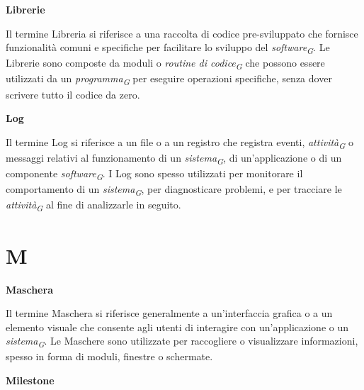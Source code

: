 \documentclass{article}
\begin{document}
\vspace{0.4cm}

\textbf{Librerie}

\vspace{0.1cm}

Il termine Libreria si riferisce a una raccolta di codice pre-sviluppato che fornisce funzionalità comuni e specifiche per facilitare lo sviluppo del \textit{software}\textsubscript{\textit{G}}. Le Librerie sono composte da moduli o \textit{routine di codice}\textsubscript{\textit{G}} che possono essere utilizzati da un \textit{programma}\textsubscript{\textit{G}} per eseguire operazioni specifiche, senza dover scrivere tutto il codice da zero.

\vspace{0.4cm}

\textbf{Log}

\vspace{0.1cm}

Il termine Log si riferisce a un file o a un registro che registra eventi, \textit{attività}\textsubscript{\textit{G}} o messaggi relativi al funzionamento di un \textit{sistema}\textsubscript{\textit{G}}, di un'applicazione o di un componente \textit{software}\textsubscript{\textit{G}}. I Log sono spesso utilizzati per monitorare il comportamento di un \textit{sistema}\textsubscript{\textit{G}}, per diagnosticare problemi, e per tracciare le \textit{attività}\textsubscript{\textit{G}} al fine di analizzarle in seguito.

\pagebreak
\section*{M}
{}

\vspace{0.4cm}

\textbf{Maschera}

\vspace{0.1cm}

Il termine Maschera si riferisce generalmente a un'interfaccia grafica o a un elemento visuale che consente agli utenti di interagire con un'applicazione o un \textit{sistema}\textsubscript{\textit{G}}. Le Maschere sono utilizzate per raccogliere o visualizzare informazioni, spesso in forma di moduli, finestre o schermate.

\vspace{0.4cm}

\textbf{Milestone}
\end{document}
